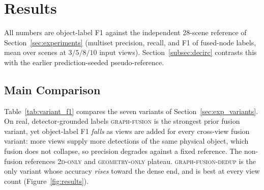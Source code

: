 \section{Results}
\label{sec:results}

All numbers are object-label F1 against the independent 28-scene reference of
Section~\ref{sec:experiments} (multiset precision, recall, and F1 of fused-node labels, mean over scenes
at $3/5/8/10$ input views). Section~\ref{subsec:decirc} contrasts this with the earlier
prediction-seeded pseudo-reference.

\subsection{Main Comparison}
\label{subsec:variants}

Table~\ref{tab:variant_f1} compares the seven variants of Section~\ref{sec:exp_variants}. On real,
detector-grounded labels \textsc{graph-fusion} is the strongest prior fusion variant, yet object-label
F1 \emph{falls} as views are added for every cross-view fusion variant: more views supply more
detections of the same physical object, which fusion does not collapse, so precision degrades against a
fixed reference. The non-fusion references \textsc{2d-only} and \textsc{geometry-only} plateau.
\textsc{graph-fusion-dedup} is the only variant whose accuracy \emph{rises} toward the dense end, and is
best at every view count (Figure~\ref{fig:results}).

\begin{table}[tb]
\centering
\caption{Object-label F1 on the independent reference (mean over 28 TUM RGB-D sequences, full multiset).
\textsc{fixed-shrink} is an uninformed control and \textsc{proposed} the rank-normalized
uncertainty-aware variant ($w{=}0.3$). Best per column in bold.}
\label{tab:variant_f1}
\small
{}
\end{table}

